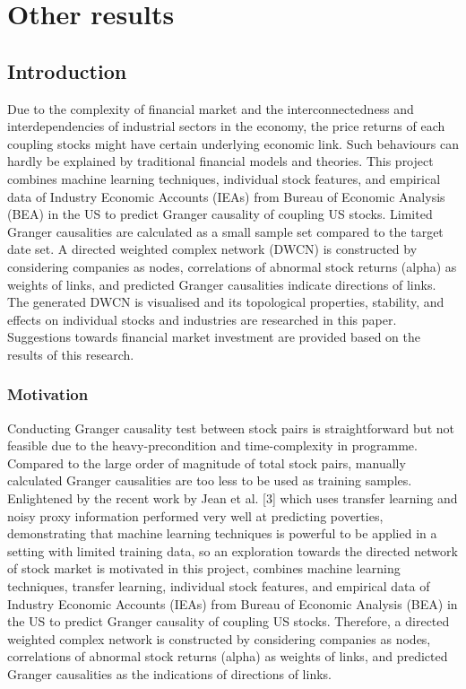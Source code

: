 \chapter{Other results}
\label{cpt:other}
\section{Introduction}
Due to the complexity of financial market and the interconnectedness and interdependencies of industrial sectors in the economy, the price returns of each coupling stocks might have certain underlying economic link. Such behaviours can hardly be explained by traditional financial models and theories. This project combines machine learning techniques, individual stock features, and empirical data of Industry Economic Accounts (IEAs) from Bureau of Economic Analysis (BEA) in the US to predict Granger causality of coupling US stocks. Limited Granger causalities are calculated as a small sample set compared to the target date set. A directed weighted complex network (DWCN) is constructed by considering companies as nodes, correlations of abnormal stock returns (alpha) as weights of links, and predicted Granger causalities indicate directions of links. The generated DWCN is visualised and its topological properties, stability, and effects on individual stocks and industries are researched in this paper. Suggestions towards financial market investment are provided based on the results of this research.

\subsection{Motivation}
Conducting Granger causality test between stock pairs is straightforward but not feasible due to the heavy-precondition and time-complexity in programme. Compared to the large order of magnitude of total stock pairs, manually calculated Granger causalities are too less to be used as training samples. Enlightened by the recent work by Jean et al. [3] which uses transfer learning and noisy proxy information performed very well at predicting poverties, demonstrating that machine learning techniques is powerful to be applied in a setting with limited training data, so an exploration towards the directed network of stock market is motivated in this project, combines machine learning techniques, transfer learning, individual stock features, and empirical data of Industry Economic Accounts (IEAs) from Bureau of Economic Analysis (BEA) in the US to predict Granger causality of coupling US stocks. Therefore, a directed weighted complex network is constructed by considering companies as nodes, correlations of abnormal stock returns (alpha) as weights of links, and predicted Granger causalities as the indications of directions of links.

